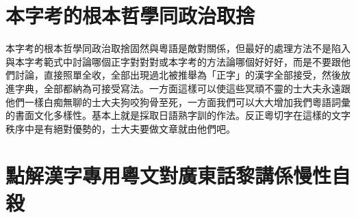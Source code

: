 


\section{本字考的根本哲學同政治取捨}

本字考的根本哲學同政治取捨固然與粵語是敵對關係，但最好的處理方法不是陷入與本字考範式中討論哪個正字對對對或本字考的方法論哪個好好好，而是不要跟他們討論，直接照單全收，全部出現過北被推舉為「正字」的漢字全部接受，然後放進字典，全部都納為可接受寫法。一方面這樣可以使這些冥頑不靈的士大夫永遠跟他們一樣白痴無聊的士大夫狗咬狗骨至死，一方面我們可以大大增加我們粵語詞彙的書面文化多樣性。基本上就是採取日語熟字訓的作法。反正粵切字在這樣的文字秩序中是有絕對優勢的，士大夫要做文章就由他們吧。

\section{點解漢字專用粵文對廣東話黎講係慢性自殺}



